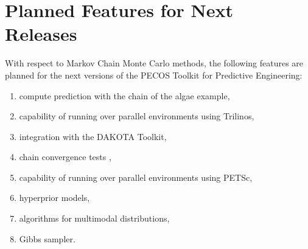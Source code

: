 \section{Planned Features for Next Releases}\label{sc-mcmc-planned-features}
With respect to Markov Chain Monte Carlo methods, the following features are planned for the next versions of the PECOS Toolkit for Predictive Engineering:
\begin{enumerate}
\item compute prediction with the chain of the algae example,
\item capability of running over parallel environments using Trilinos,
\item integration with the DAKOTA Toolkit,
\item chain convergence tests \cite{BrRo98},
\item capability of running over parallel environments using PETSc,
\item hyperprior models,
\item algorithms for multimodal distributions,
\item Gibbs sampler.
\end{enumerate}
